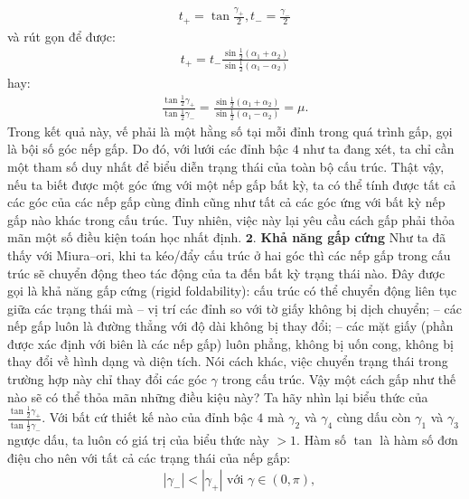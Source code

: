 \begin{multicols}{2}
	\begin{align*}
		t_+ = \tan\frac{\gamma_+}{2}, t_- = \frac{\gamma_-}{2}
	\end{align*}
	và rút gọn để được:
	\begin{align*}
		t_+ = t_- \frac{\sin\frac{1}{2}\left(\alpha_1 + \alpha_2\right)}{\sin\frac{1}{2}\left(\alpha_1 - \alpha_2\right)}
	\end{align*}
	hay:
	\begin{align*}
		\frac{\tan\frac{1}{2}\gamma_+}{\tan\frac{1}{2}\gamma_-} = \frac{\sin\frac{1}{2}\left(\alpha_1 + \alpha_2\right)}{\sin\frac{1}{2}\left(\alpha_1 - \alpha_2\right)} = \mu.
	\end{align*}
	Trong kết quả này, vế phải là một hằng số tại mỗi đỉnh trong quá trình gấp, gọi là bội số góc nếp gấp. Do đó, với lưới các đỉnh bậc $4$ như ta đang xét, ta chỉ cần một tham số duy nhất để biểu diễn trạng thái của toàn bộ cấu trúc. Thật vậy, nếu ta biết được một góc ứng với một nếp gấp bất kỳ, ta có thể tính được tất cả các góc của các nếp gấp cùng đỉnh cũng như tất cả các góc ứng với bất kỳ nếp gấp nào khác trong cấu trúc. Tuy nhiên, việc này lại yêu cầu cách gấp phải thỏa mãn một số điều kiện toán học nhất định.
	\vskip 0.05cm
	$\pmb{2.}$ \textbf{\color{toanhocdoisong}Khả năng gấp cứng}
	\vskip 0.05cm
	Như ta đã thấy với Miura--ori, khi ta kéo/đẩy cấu trúc ở hai góc thì các nếp gấp trong cấu trúc sẽ chuyển động theo tác động của ta đến bất kỳ trạng thái nào. Đây được gọi là khả năng gấp cứng (rigid foldability): cấu trúc có thể chuyển động liên tục giữa các trạng thái mà 
	\vskip 0.05cm
	-- vị trí các đỉnh so với tờ giấy không bị dịch chuyển; 
	\vskip 0.05cm
	-- các nếp gấp luôn là đường thẳng với độ dài không bị thay đổi;
	\vskip 0.05cm
	-- các mặt giấy (phần được xác định với biên là các nếp gấp) luôn phẳng, không bị uốn cong, không bị thay đổi về hình dạng và diện tích.
	\vskip 0.05cm
	Nói cách khác, việc chuyển trạng thái trong trường hợp này chỉ thay đổi các góc $\gamma$ trong cấu trúc.
	\vskip 0.05cm
	Vậy một cách gấp như thế nào sẽ có thể thỏa mãn những điều kiệu này?
	\vskip 0.05cm
	Ta hãy nhìn lại biểu thức của $\frac{\tan\frac{1}{2}\gamma_+}{\tan\frac{1}{2}\gamma_-}$. Với bất cứ thiết kế nào của đỉnh bậc $4$ mà $\gamma_2$ và $\gamma_4$ cùng dấu còn $\gamma_1$ và $\gamma_3$ ngược dấu, ta luôn có giá trị của biểu thức này $> 1$. Hàm số $\tan$ là hàm số đơn điệu cho nên với tất cả các trạng thái của nếp gấp:
	\begin{align*}
		&|\gamma_-| < |\gamma_+| \text{  với  } \gamma \in (0,\pi),\\

\end{align*}
\end{multicols}
